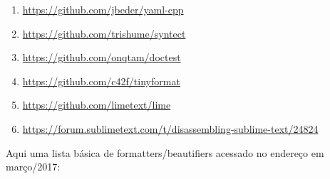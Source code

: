     \medskip
    \begin{myquote}
    \begin{enumerate}[nolistsep]

        \item \url{https://github.com/jbeder/yaml-cpp}
        \item \url{https://github.com/trishume/syntect}
        \item \url{https://github.com/onqtam/doctest}
        \item \url{https://github.com/c42f/tinyformat}
        \item \url{https://github.com/limetext/lime}
        \item \url{https://forum.sublimetext.com/t/disassembling-sublime-text/24824}

    \end{enumerate}
    \end{myquote}

    Aqui uma lista básica de formatters/beautifiers acessado no endereço
     em março/2017:

